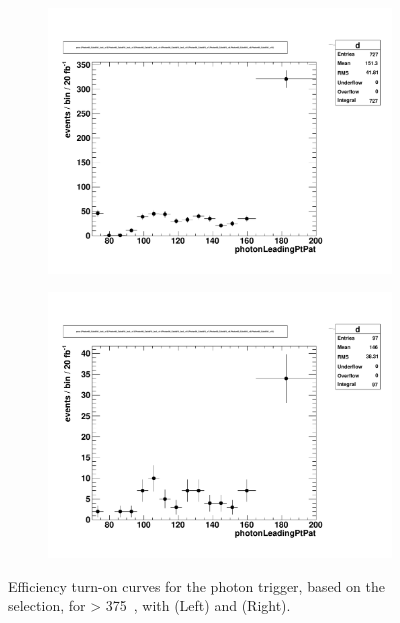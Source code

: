 \begin{figure}[t]
  \centering
  \begin{subfigure}[b]{0.35\textwidth}
    \includegraphics[width=\textwidth, page=3,trim=40 40 160 120,clip=true]{Figs/trigger/g_barrel_375_caloJet_le3j.pdf}
    \caption{\njlow}
    \label{fig:photon_control_trigeff_le3j}
  \end{subfigure}
  \begin{subfigure}[b]{0.35\textwidth}
    \includegraphics[width=\textwidth, page=3,trim=40 40 160 120,clip=true]{Figs/trigger/g_barrel_375_caloJet_ge4j.pdf}
    \caption{\njhigh}
    \label{fig:photon_control_trigeff_ge4j}
  \end{subfigure}
  \caption{Efficiency turn-on curves for the photon trigger, based on the \gj 
  selection, for \HT > 375~\gev, with \njlow (Left) and \njhigh(Right).}
  \label{fig:photon_control_trigeff}
\end{figure}

